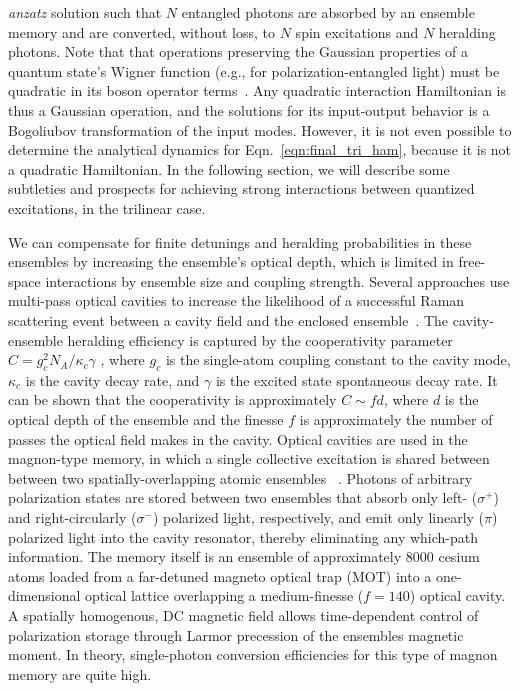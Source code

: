 \documentclass[aps,twocolumn,secnumarabic,amsmath,amssymb,pra,groupedaddress,
showpacs, showkeys]{revtex4-1}
\begin{document}
\emph{anzatz} solution such that $N$ entangled photons are absorbed by an
ensemble memory and are converted, without loss, to $N$ spin excitations and
$N$ heralding photons.  Note that that operations preserving the Gaussian
properties of a quantum state's Wigner function (e.g., for
polarization-entangled light) must be quadratic in its boson operator
terms~\cite{RevModPhys.77.513}. Any quadratic interaction Hamiltonian is thus a
Gaussian operation, and the solutions for its input-output behavior is a
Bogoliubov transformation of the input modes. However, it is not even possible
to determine the analytical dynamics for Eqn.~\ref{eqn:final_tri_ham}, because
it is not a quadratic Hamiltonian. In the following section, we will describe
some subtleties and prospects for achieving strong interactions between
quantized excitations, in the trilinear case.

We can compensate for finite detunings and heralding probabilities in these
ensembles by increasing the ensemble's optical depth, which is limited in
free-space interactions by ensemble size and coupling strength. Several
approaches use multi-pass optical cavities to increase the likelihood of a
successful Raman scattering event between a cavity field and the enclosed
ensemble~\cite{PhysRevLett.92.123601, PhysRevLett.95.133601,
  PhysRevLett.98.190503,Thompson07072006,PhysRevLett.98.183601}. The
cavity-ensemble heralding efficiency is captured by the cooperativity parameter
$C=g_c^2 N_A/\kappa_c \gamma$ , where $g_c$ is the single-atom coupling
constant to the cavity mode, $\kappa_c$ is the cavity decay rate, and $\gamma$
is the excited state spontaneous decay rate. It can be shown that the
cooperativity is approximately $C\sim fd$, where $d$ is the optical depth of
the ensemble and the finesse ${f}$ is approximately the number of passes the
optical field makes in the cavity. Optical cavities are used in the magnon-type
memory, in which a single collective excitation is shared between between two
spatially-overlapping atomic ensembles ~\cite{PhysRevLett.103.043601}. Photons
of arbitrary polarization states are stored between two ensembles that absorb
only left- ($\sigma^{+}$) and right-circularly ($\sigma^{-}$) polarized light,
respectively, and emit only linearly ($\pi$) polarized light into the cavity
resonator, thereby eliminating any which-path information. The memory itself is
an ensemble of approximately 8000 cesium atoms loaded from a far-detuned
magneto optical trap (MOT) into a one-dimensional optical lattice overlapping a
medium-finesse ($f=140$) optical cavity. A spatially homogenous, DC magnetic
field allows time-dependent control of polarization storage through Larmor
precession of the ensembles magnetic moment. In theory, single-photon
conversion efficiencies for this type of magnon memory are quite high.
\end{document}
